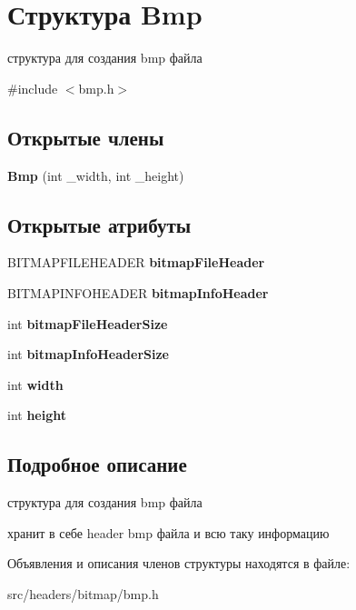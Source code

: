 \hypertarget{struct_bmp}{}\section{Структура Bmp}
\label{struct_bmp}


структура для создания bmp файла  




{\ttfamily \#include $<$bmp.\+h$>$}

\subsection*{Открытые члены}
\begin{DoxyCompactItemize}
\item 
\mbox{\label{struct_bmp_a042495bc8208d6eae8e1ded23b417740}} 
{\bfseries Bmp} (int \+\_\+width, int \+\_\+height)
\end{DoxyCompactItemize}
\subsection*{Открытые атрибуты}
\begin{DoxyCompactItemize}
\item 
\mbox{\label{struct_bmp_a2db58a105497ee8f83cceebca8952b63}} 
B\+I\+T\+M\+A\+P\+F\+I\+L\+E\+H\+E\+A\+D\+ER {\bfseries bitmap\+File\+Header}
\item 
\mbox{\label{struct_bmp_a37ac743084ea34040e2b3e4a3eea3ff2}} 
B\+I\+T\+M\+A\+P\+I\+N\+F\+O\+H\+E\+A\+D\+ER {\bfseries bitmap\+Info\+Header}
\item 
\mbox{\label{struct_bmp_a111d930e13fd09742da5cb048519fc77}} 
int {\bfseries bitmap\+File\+Header\+Size}
\item 
\mbox{\label{struct_bmp_ae604238bfd3426509cf3479e85ea0d46}} 
int {\bfseries bitmap\+Info\+Header\+Size}
\item 
\mbox{\label{struct_bmp_ae5901fc7980394c5a0a9173103550cb9}} 
int {\bfseries width}
\item 
\mbox{\label{struct_bmp_ab79e215f3eb038b8f15632fecf6c3745}} 
int {\bfseries height}
\end{DoxyCompactItemize}


\subsection{Подробное описание}
структура для создания bmp файла 

хранит в себе header bmp файла и всю таку информацию 

Объявления и описания членов структуры находятся в файле\+:\begin{DoxyCompactItemize}
\item 
src/headers/bitmap/bmp.\+h\end{DoxyCompactItemize}
